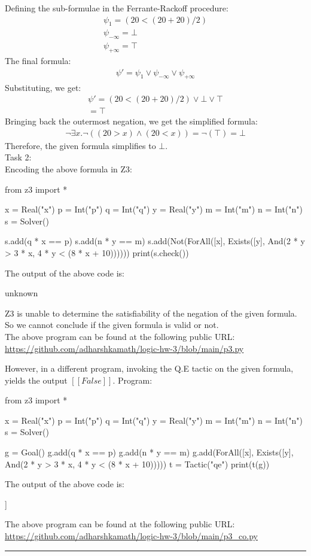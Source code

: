 \documentclass[12pt,letterpaper, onecolumn]{exam}
\newcommand{\link}[1]{{\color{blue}\href{#1}{#1}}}
\begin{document}
\begin{questions}
	Defining the sub-formulae in the Ferrante-Rackoff procedure:
	\begin{align*}
		\psi_1 = (20 < (20 + 20) / 2) \\
		\psi_{-\infty} = \bot \\
		\psi_{+\infty} = \top 
	\end{align*}
	The final formula:
	\begin{align*}
		\psi' = \psi_1 \lor \psi_{-\infty} \lor \psi_{+\infty}
	\end{align*}
	Substituting, we get:
	\begin{align*}
		\psi' = (20 < (20 + 20) / 2) \lor \bot \lor \top \\
		= \top
	\end{align*}
	Bringing back the outermost negation, we get the simplified formula:
	\begin{align*}
		\neg \exists x. \neg ((20 > x) \land (20 < x)) = \neg (\top) = \bot
	\end{align*}
	Therefore, the given formula simplifies to $ \bot $. \\

	Task 2: \\
	Encoding the above formula in Z3:
	\begin{python}
from z3 import *

x = Real("x")
p = Int("p")
q = Int("q")
y = Real("y")
m = Int("m")
n = Int("n")
s = Solver()

s.add(q * x == p)
s.add(n * y == m)
s.add(Not(ForAll([x], Exists([y], And(2 * y > 3 * x, 4 * y < (8 * x + 10))))))
print(s.check())
	\end{python}
	The output of the above code is:
	\begin{python}
unknown
	\end{python}
	Z3 is unable to determine the satisfiability of the negation of the given formula. So we cannot conclude if the given formula is valid or not. \\
	The above program can be found at the following public URL: \\
	\link{https://github.com/adharshkamath/logic-hw-3/blob/main/p3.py}


	However, in a different program, invoking the Q.E tactic on the given formula, yields the output $ [[False]] $. Program: \\
	\begin{python}
from z3 import *

x = Real("x")
p = Int("p")
q = Int("q")
y = Real("y")
m = Int("m")
n = Int("n")
s = Solver()

g = Goal()
g.add(q * x == p)
g.add(n * y == m)
g.add(ForAll([x], Exists([y], And(2 * y > 3 * x, 4 * y < (8 * x + 10)))))
t = Tactic("qe")
print(t(g))
	\end{python}
	The output of the above code is:
	\begin{python}
[[False]]
	\end{python}

	The above program can be found at the following public URL: \\
	\link{https://github.com/adharshkamath/logic-hw-3/blob/main/p3\_co.py}

    {\rule{17cm}{0.4pt}}

\end{questions}
\end{document}
